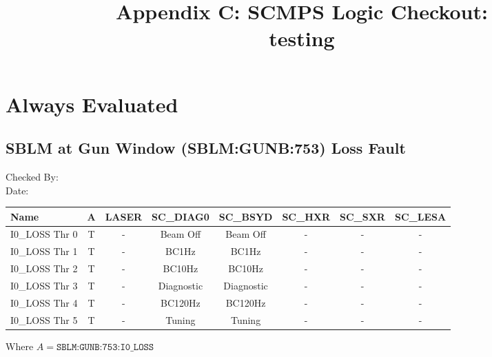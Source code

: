 \documentclass[10pt, oneside]{book}
\title{Appendix C: SCMPS Logic Checkout:\\testing}
\date{}
\begin{document}
\maketitle
\addtocounter{page}{1}
\newpage
\chapter{Always Evaluated}
\section{SBLM at Gun Window (SBLM:GUNB:753) Loss Fault}
Checked By:\\
Date:
\begin{center}
\begin{tabular}{@{}lccccccc@{}}
\toprule
Name & A & LASER & SC\_DIAG0 & SC\_BSYD & SC\_HXR & SC\_SXR & SC\_LESA \\
\midrule
I0\_LOSS Thr 0 & T & - & Beam Off & Beam Off & - & - & - \\
I0\_LOSS Thr 1 & T & - & BC1Hz & BC1Hz & - & - & - \\
I0\_LOSS Thr 2 & T & - & BC10Hz & BC10Hz & - & - & - \\
I0\_LOSS Thr 3 & T & - & Diagnostic & Diagnostic & - & - & - \\
I0\_LOSS Thr 4 & T & - & BC120Hz & BC120Hz & - & - & - \\
I0\_LOSS Thr 5 & T & - & Tuning & Tuning & - & - & - \\
\bottomrule
\end{tabular}
\end{center}
Where \newline
$A = \texttt{SBLM:GUNB:753:I0\_LOSS}$\newline
\end{document}
